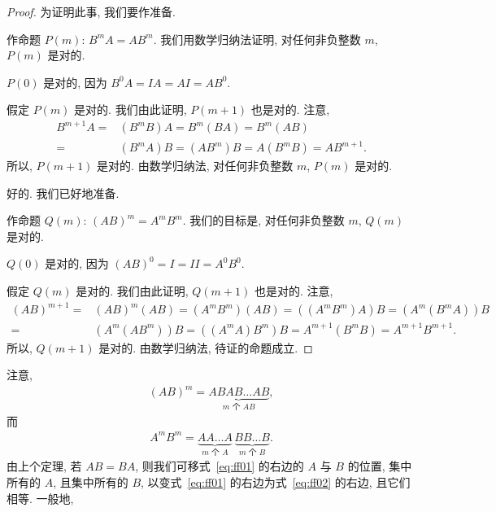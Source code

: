 \documentclass[../libro.tex]{subfiles}
\begin{document}
\begin{proof}
    为证明此事, 我们要作准备.

    作命题 \(P(m)\): \(B^{m} A = A B^{m}\).
    我们用数学归纳法证明,
    对任何非负整数 \(m\), \(P(m)\) 是对的.

    \(P(0)\) 是对的, 因为
    \(B^{0} A = I A = A I = A B^{0}\).

    假定 \(P(m)\) 是对的.
    我们由此证明, \(P(m+1)\) 也是对的.
    注意,
    \begin{align*}
        B^{m+1} A
        = {} &
        (B^{m} B) A
        = B^{m} (B A)
        = B^{m} (A B)
        \\
        = {} &
        (B^{m} A) B
        = (A B^{m}) B
        = A (B^{m} B)
        = A B^{m+1}.
    \end{align*}
    所以, \(P(m+1)\) 是对的.
    由数学归纳法, 对任何非负整数 \(m\), \(P(m)\) 是对的.

    好的.
    我们已好地准备.

    作命题 \(Q(m)\):
    \((AB)^{m} = A^{m} B^{m}\).
    我们的目标是,
    对任何非负整数 \(m\), \(Q(m)\) 是对的.

    \(Q(0)\) 是对的, 因为
    \((AB)^0 = I = I I = A^0 B^0\).

    假定 \(Q(m)\) 是对的.
    我们由此证明, \(Q(m+1)\) 也是对的.
    注意,
    \begin{align*}
        (AB)^{m+1}
        = {} &
        (AB)^{m} (AB)
        = (A^{m} B^{m}) (A B)
        = ((A^{m} B^{m}) A) B
        = (A^{m} (B^{m} A)) B
        \\
        = {} &
        (A^{m} (A B^{m})) B
        = ((A^{m} A) B^{m}) B
        = A^{m+1} (B^{m} B)
        = A^{m+1} B^{m+1}.
    \end{align*}
    所以, \(Q(m+1)\) 是对的.
    由数学归纳法, 待证的命题成立.
\end{proof}

注意,
\begin{align}
    (A B)^m = \underbrace{A B A B \dots A B}_{\text{\(m\)~个 \(A B\)}},
    \label{eq:ff01}
\end{align}
而
\begin{align}
    A^m B^m = \underbrace{A A \dots A}_{\text{\(m\)~个 \(A\)}}
    \, \underbrace{B B \dots B}_{\text{\(m\)~个 \(B\)}}.
    \label{eq:ff02}
\end{align}
由上个定理, 若 \(A B = B A\),
则我们可移式~\eqref{eq:ff01} 的右边的 \(A\) 与 \(B\) 的位置,
集中所有的 \(A\), 且集中所有的 \(B\),
以变式~\eqref{eq:ff01} 的右边为式~\eqref{eq:ff02} 的右边,
且它们相等.
一般地,
\end{document}

